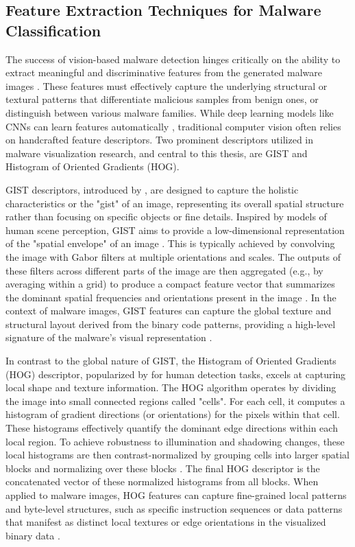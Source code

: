 \subsection{Feature Extraction Techniques for Malware Classification}
\label{subsec:feature_extraction}

The success of vision-based malware detection hinges critically on the ability to extract meaningful and discriminative features from the generated malware images \cite{gibert2020rise}. These features must effectively capture the underlying structural or textural patterns that differentiate malicious samples from benign ones, or distinguish between various malware families. While deep learning models like CNNs can learn features automatically \cite{zhang2023malware, vasan2020image}, traditional computer vision often relies on handcrafted feature descriptors. Two prominent descriptors utilized in malware visualization research, and central to this thesis, are GIST and Histogram of Oriented Gradients (HOG).

GIST descriptors, introduced by \citet{oliva2001modeling}, are designed to capture the holistic characteristics or the "gist" of an image, representing its overall spatial structure rather than focusing on specific objects or fine details. Inspired by models of human scene perception, GIST aims to provide a low-dimensional representation of the "spatial envelope" of an image \cite{oliva2001modeling}. This is typically achieved by convolving the image with Gabor filters at multiple orientations and scales. The outputs of these filters across different parts of the image are then aggregated (e.g., by averaging within a grid) to produce a compact feature vector that summarizes the dominant spatial frequencies and orientations present in the image \cite{nataraj2011malware, oliva2001modeling}. In the context of malware images, GIST features can capture the global texture and structural layout derived from the binary code patterns, providing a high-level signature of the malware's visual representation \cite{yajamanam2018deep}.

In contrast to the global nature of GIST, the Histogram of Oriented Gradients (HOG) descriptor, popularized by \citet{dalal2005histograms} for human detection tasks, excels at capturing local shape and texture information. The HOG algorithm operates by dividing the image into small connected regions called "cells". For each cell, it computes a histogram of gradient directions (or orientations) for the pixels within that cell. These histograms effectively quantify the dominant edge directions within each local region. To achieve robustness to illumination and shadowing changes, these local histograms are then contrast-normalized by grouping cells into larger spatial blocks and normalizing over these blocks \cite{dalal2005histograms}. The final HOG descriptor is the concatenated vector of these normalized histograms from all blocks. When applied to malware images, HOG features can capture fine-grained local patterns and byte-level structures, such as specific instruction sequences or data patterns that manifest as distinct local textures or edge orientations in the visualized binary data \cite{bozkir2021catch}.

